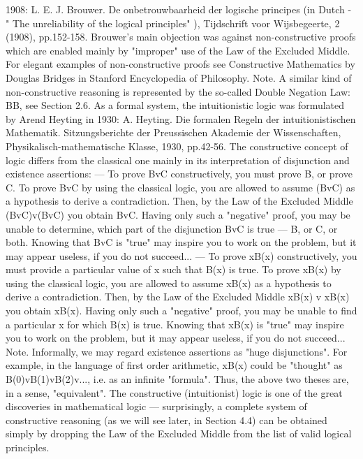 1908:
L. E. J. Brouwer. De onbetrouwbaarheid der logische principes (in Dutch - " The unreliability of the logical principles" ),
Tijdschrift voor Wijsbegeerte, 2 (1908), pp.152-158.
Brouwer's main objection was against non-constructive proofs which are enabled mainly by "improper"
use of the Law of the Excluded Middle.
For elegant examples of non-constructive proofs see Constructive Mathematics by Douglas Bridges in
Stanford Encyclopedia of Philosophy.
Note. A similar kind of non-constructive reasoning is represented by the so-called Double Negation Law:
\neg \neg B\IMPLIES B, see Section 2.6.
As a formal system, the intuitionistic logic was formulated by Arend Heyting in 1930:
A. Heyting. Die formalen Regeln der intuitionistischen Mathematik. Sitzungsberichte der Preussischen Akademie der
Wissenschaften, Physikalisch-mathematische Klasse, 1930, pp.42-56.
The constructive concept of logic differs from the classical one mainly in its interpretation of disjunction
and existence assertions:
--- To prove BvC constructively, you must prove B, or prove C. To prove BvC by using the classical logic,
you are allowed to assume \neg (BvC) as a hypothesis to derive a contradiction. Then, by the Law of the
Excluded Middle (BvC)v\neg (BvC) you obtain BvC. Having only such a "negative" proof, you may be
unable to determine, which part of the disjunction BvC is true --- B, or C, or both. Knowing that BvC is
"true" may inspire you to work on the problem, but it may appear useless, if you do not succeed...
--- To prove \exists xB(x) constructively, you must provide a particular value of x such that B(x) is true. To
prove \exists xB(x) by using the classical logic, you are allowed to assume \forall x\neg B(x) as a hypothesis to derive a
contradiction. Then, by the Law of the Excluded Middle \exists xB(x) v \neg \exists xB(x) you obtain \exists xB(x). Having
only such a "negative" proof, you may be unable to find a particular x for which B(x) is true. Knowing
that \exists xB(x) is "true" may inspire you to work on the problem, but it may appear useless, if you do not
succeed...
Note. Informally, we may regard existence assertions as "huge disjunctions". For example, in the
language of first order arithmetic, \exists xB(x) could be "thought" as B(0)vB(1)vB(2)v..., i.e. as an infinite
"formula". Thus, the above two theses are, in a sense, "equivalent".
The constructive (intuitionist) logic is one of the great discoveries in mathematical logic --- surprisingly, a
complete system of constructive reasoning (as we will see later, in Section 4.4) can be obtained simply by
dropping the Law of the Excluded Middle from the list of valid logical principles.
